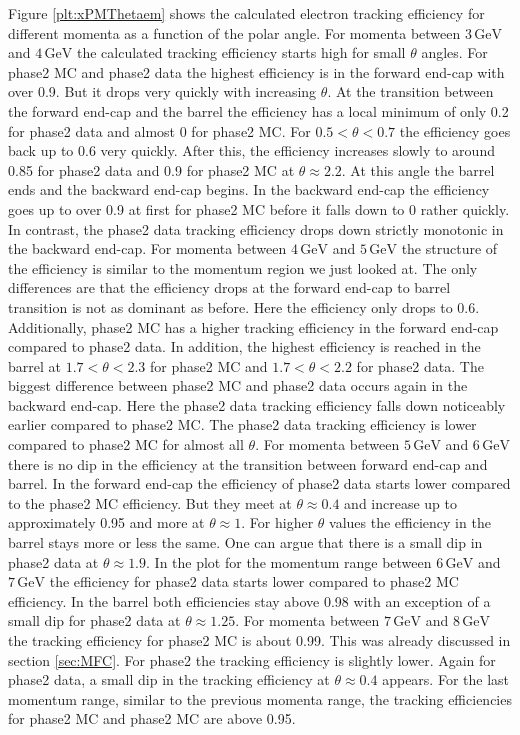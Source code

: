 \documentclass[a4paper,11pt,twosided,final,german,openbib,pdftex,listof=totoc,bibliography=totoc]{scrbook}
\begin{document}
Figure \ref{plt:xPMThetaem} shows the calculated electron tracking efficiency for different momenta as a function of the polar angle. For momenta between $3\,\textrm{GeV}$ and $4\,\textrm{GeV}$ the calculated tracking efficiency starts high for small $\theta$ angles. For phase2 MC and phase2 data the highest efficiency is in the forward end-cap with over 0.9. But it drops very quickly with increasing $\theta$. At the transition between the forward end-cap and the barrel the efficiency has a local minimum of only 0.2 for phase2 data and almost 0 for phase2 MC.
For $0.5 < \theta < 0.7$ the efficiency goes back up to 0.6 very quickly. After this, the efficiency increases slowly to around 0.85 for phase2 data and 0.9 for phase2 MC at $\theta \approx 2.2$. At this angle the barrel ends and the backward end-cap begins. 
In the backward end-cap the efficiency goes up to over 0.9 at first for phase2 MC before it falls down to 0 rather quickly. In contrast, the phase2 data tracking efficiency drops down strictly monotonic in the backward end-cap. 
For momenta between $4\,\textrm{GeV}$ and $5\,\textrm{GeV}$ the structure of the efficiency is similar to the momentum region we just looked at. The only differences are that the efficiency drops at the forward end-cap to barrel transition is not as dominant as before. Here the efficiency only drops to 0.6. Additionally, phase2 MC has a higher tracking efficiency in the forward end-cap compared to phase2 data.
In addition, the highest efficiency is reached in the barrel at $1.7< \theta <2.3$ for phase2 MC and $1.7< \theta <2.2$ for phase2 data. The biggest difference between phase2 MC and phase2 data occurs again in the backward end-cap. Here the phase2 data tracking efficiency falls down noticeably earlier compared to phase2 MC. The phase2 data tracking efficiency is lower compared to phase2 MC for almost all $\theta$.
For momenta between $5\,\textrm{GeV}$ and $6\,\textrm{GeV}$ there is no dip in the efficiency at the transition between forward end-cap and barrel. In the forward end-cap the efficiency of phase2 data starts lower compared to the phase2 MC efficiency. But they meet at $\theta \approx 0.4$  and increase up to approximately 0.95 and more at $\theta \approx 1$.
For higher $\theta$ values the efficiency in the barrel stays more or less the same. One can argue that there is a small dip in phase2 data at $\theta \approx 1.9$.
In the plot for the momentum range between $6\,\textrm{GeV}$ and $7\,\textrm{GeV}$ the efficiency for phase2 data starts lower compared to phase2 MC efficiency. In the barrel both efficiencies stay above 0.98 with an exception of a small dip for phase2 data at $\theta \approx 1.25$. 
For momenta  between $7\,\textrm{GeV}$ and $8\,\textrm{GeV}$ the tracking efficiency for phase2 MC is about 0.99. This was already discussed in section \ref{sec:MFC}. For phase2 the tracking efficiency is slightly lower. Again for phase2 data, a small dip in the tracking efficiency at $\theta \approx 0.4$ appears. 
For the last momentum range, similar to the previous momenta range, the tracking efficiencies for phase2 MC and phase2 MC are above 0.95.
 
\end{document}
